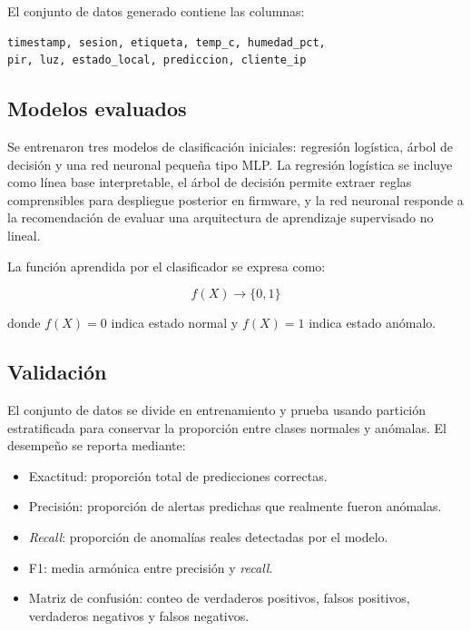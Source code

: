 El conjunto de datos generado contiene las columnas:

\begin{verbatim}
timestamp, sesion, etiqueta, temp_c, humedad_pct,
pir, luz, estado_local, prediccion, cliente_ip
\end{verbatim}

\subsection{Modelos evaluados}

Se entrenaron tres modelos de clasificaci\'on iniciales: regresi\'on log\'istica, \'arbol de decisi\'on y una red neuronal peque\~na tipo MLP. La regresi\'on log\'istica se incluye como l\'inea base interpretable, el \'arbol de decisi\'on permite extraer reglas comprensibles para despliegue posterior en firmware, y la red neuronal responde a la recomendaci\'on de evaluar una arquitectura de aprendizaje supervisado no lineal.

La funci\'on aprendida por el clasificador se expresa como:

\begin{equation}
f(X) \rightarrow \{0,1\}
\end{equation}

donde $f(X)=0$ indica estado normal y $f(X)=1$ indica estado an\'omalo.

\subsection{Validaci\'on}

El conjunto de datos se divide en entrenamiento y prueba usando partici\'on estratificada para conservar la proporci\'on entre clases normales y an\'omalas. El desempe\~no se reporta mediante:

\begin{itemize}
  \item Exactitud: proporci\'on total de predicciones correctas.
  \item Precisi\'on: proporci\'on de alertas predichas que realmente fueron an\'omalas.
  \item \textit{Recall}: proporci\'on de anomal\'ias reales detectadas por el modelo.
  \item F1: media arm\'onica entre precisi\'on y \textit{recall}.
  \item Matriz de confusi\'on: conteo de verdaderos positivos, falsos positivos, verdaderos negativos y falsos negativos.
\end{itemize}

